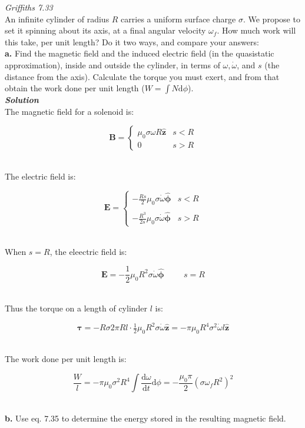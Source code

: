 \documentclass[9pt]{extarticle}
\renewcommand{\v}[1]{{\bm #1}}
\newcommand{\hv}[1]{\hat{\bm{#1}}}
\newcommand{\bfit}[1]{\textbf{\textit{#1}}}
\renewcommand{\d}{\text{d}}
\newcommand{\ddt}[1]{\frac{\d #1}{\d t}}
\newcommand{\muo}{\mu_0}
\begin{document}
\begin{multicols*}{2}
{\it Griffiths 7.33} \\ 

An infinite cylinder of radius $R$ carries a uniform surface charge $\sigma$. We propose to set it spinning about its axis, at a final angular velocity $\omega_f$. How much work will this take, per unit length? Do it two ways, and compare your answers: \\ 

{\Large \bf a.} Find the magnetic field and the induced electric field (in the quasistatic  approximation), inside and outside the cylinder, in terms of $\omega,  \dot\omega$, and $s$ (the distance from the axis). Calculate the torque you must exert, and from that obtain the work  done per unit length ($W = \int N\d\phi$). \\ 

{\bfit{Solution}} \\ 

The magnetic field for a solenoid is:

$$
\v B = 
\begin{cases}
	\muo \sigma\omega R \hv z & s < R \\ 
	0 & s > R
\end{cases}
$$ \ 

The electric field is:

$$
\v E = 
\begin{cases}
	 -\frac{Rs}{2} \muo \sigma \dot\omega \hv \phi & s < R \\
	 \\ 
	 -\frac{R^3}{2s} \muo \sigma \dot\omega \hv \phi & s > R
\end{cases}
$$ \ 

When $s=R$, the eleectric field is:

$$\v E = -\frac 12 \muo R^2 \sigma \dot\omega \hv \phi \hspace{1cm} s=R$$ \ 

Thus the torque on a length of cylinder $l$ is:

$$\v \tau = -R\sigma 2\pi Rl \cdot \tfrac 12 \muo R^2 \sigma \dot\omega \hv z = -\pi \muo R^4 \sigma^2 \dot\omega l \hv z$$ \ 

The work  done per unit length is:

$$\frac Wl = -\pi \muo \sigma^2 R^4 \int \ddt\omega \d \phi = -\frac{\muo  \pi}{2} (\sigma \omega_f R^2)^2$$ \ 




\dotfill 

\hfill 

{\Large \bf b.} Use eq. 7.35 to  determine the energy stored in the resulting magnetic field. \\ 


\end{multicols*}
\end{document}
